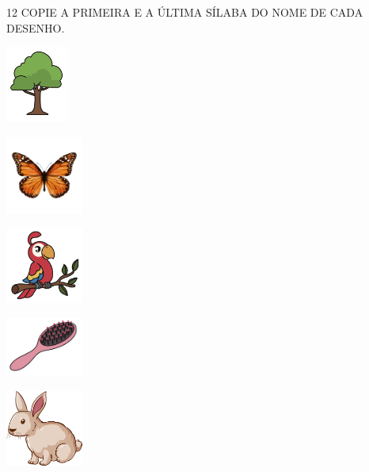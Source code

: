 \begin{center}
\begin{tabular}{ll}
\end{tabular}
\end{center}

\pagebreak

\num{12} COPIE A PRIMEIRA E A ÚLTIMA SÍLABA DO NOME DE CADA DESENHO.

\begin{escolha}
\item \includegraphics[width=0.8in]{media/image110.png}\\

\item \includegraphics[width=1in]{media/image111.jpg}\\

\item \includegraphics[width=1in]{media/image112.png}\\

\item \includegraphics[width=1in]{media/image75.png}\\

\item \includegraphics[width=1in]{media/image70.png}\\


\end{escolha}
